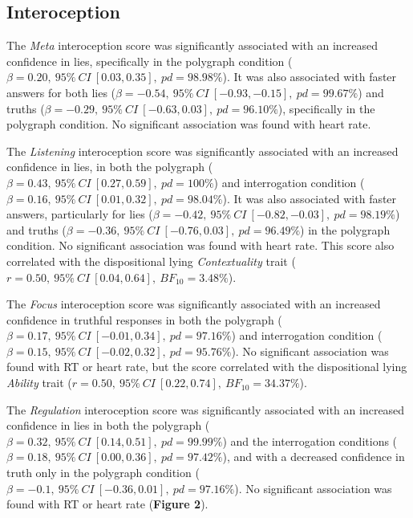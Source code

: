 \documentclass[
  man,mask,floatsintext]{apa6}
\begin{document}
\hypertarget{interoception-1}{%
\subsection{Interoception}\label{interoception-1}}

The \emph{Meta} interoception score was significantly associated with an increased confidence in lies, specifically in the polygraph condition (\(\beta=0.20,~95\%~CI~[0.03, 0.35],~pd = 98.98\%\)). It was also associated with faster answers for both lies (\(\beta=-0.54,~95\%~CI~[-0.93, -0.15],~pd = 99.67\%\)) and truths (\(\beta=-0.29,~95\%~CI~[-0.63, 0.03],~pd = 96.10\%\)), specifically in the polygraph condition. No significant association was found with heart rate.

The \emph{Listening} interoception score was significantly associated with an increased confidence in lies, in both the polygraph (\(\beta=0.43,~95\%~CI~[0.27, 0.59],~pd = 100\%\)) and interrogation condition (\(\beta=0.16,~95\%~CI~[0.01, 0.32],~pd = 98.04\%\)). It was also associated with faster answers, particularly for lies (\(\beta=-0.42,~95\%~CI~[-0.82, -0.03],~pd = 98.19\%\)) and truths (\(\beta=-0.36,~95\%~CI~[-0.76, 0.03],~pd = 96.49\%\)) in the polygraph condition. No significant association was found with heart rate. This score also correlated with the dispositional lying \emph{Contextuality} trait (\(r = 0.50,~95\%~CI~[0.04, 0.64],~BF_{10} = 3.48\%\)).

The \emph{Focus} interoception score was significantly associated with an increased confidence in truthful responses in both the polygraph (\(\beta=0.17,~95\%~CI~[-0.01, 0.34],~pd = 97.16\%\)) and interrogation condition (\(\beta=0.15,~95\%~CI~[-0.02, 0.32],~pd = 95.76\%\)). No significant association was found with RT or heart rate, but the score correlated with the dispositional lying \emph{Ability} trait (\(r = 0.50,~95\%~CI~[0.22, 0.74],~BF_{10} = 34.37\%\)).

The \emph{Regulation} interoception score was significantly associated with an increased confidence in lies in both the polygraph (\(\beta=0.32,~95\%~CI~[0.14, 0.51],~pd = 99.99\%\)) and the interrogation conditions (\(\beta=0.18,~95\%~CI~[0.00, 0.36],~pd = 97.42\%\)), and with a decreased confidence in truth only in the polygraph condition (\(\beta=-0.1,~95\%~CI~[-0.36, 0.01],~pd = 97.16\%\)). No significant association was found with RT or heart rate (\textbf{Figure 2}).
\end{document}
